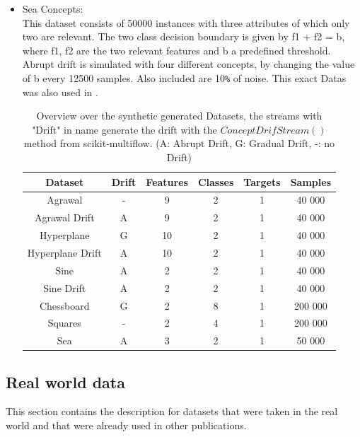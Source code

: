 \documentclass[12pt,oneside,a4paper,parskip]{scrbook}
\begin{document}
\begin{itemize}
  \item Sea Concepts: \\
        This dataset consists of 50000 instances with three attributes of which only two are relevant. 
        The two class decision boundary is given by f1 + f2 = b, where f1, f2 are the two relevant features and b a
        predefined threshold. Abrupt drift is simulated with four different concepts, by changing the value of b every 
        12500 samples. Also included are 10\verb|%| of noise. 
        This exact Datas was also used in \cite{SEADataset}.

        \begin{table}[H]
          \label{tab:synthdata}
          \centering
          \begin{tabular} {|| c c c c c c ||} 
            \hline
              Dataset & Drift &Features & Classes & Targets & Samples \\
            \hline\hline
              Agrawal & - & 9 & 2 & 1 & 40 000 \\
            \hline
              Agrawal Drift & A & 9 & 2 & 1 & 40 000 \\
            \hline 
              Hyperplane & G & 10 & 2 & 1 & 40 000 \\
            \hline 
              Hyperplane Drift & A & 10 & 2 & 1 & 40 000 \\
            \hline
              Sine & A & 2 & 2 & 1 & 40 000 \\
            \hline
              Sine Drift & A & 2 & 2 & 1 & 40 000 \\
            \hline
              Chessboard & G & 2 & 8 & 1 & 200 000 \\
            \hline
              Squares & - & 2 & 4 & 1 & 200 000 \\
            \hline
              Sea & A & 3 & 2 & 1 & 50 000 \\
            \hline
          \end{tabular} 
          \caption{Overview over the synthetic generated Datasets, the streams with "Drift" in name generate the drift
          with the $ConceptDrifStream()$ method from scikit-multiflow. (A: Abrupt Drift, G: Gradual Drift, -: no Drift) }
        \end{table}
  
\end{itemize}

\subsection{Real world data}
This section contains the description for datasets that were taken in the real world and that were already used in other
publications. 
\end{document}
